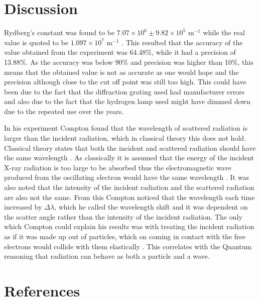 \documentclass[12pt, a4paper]{article}
\begin{document}
\section*{Discussion}
Rydberg's constant was found to be $7.07\times10^6 \pm 9.82\times10^5 \text{ m}^{-1}$ while the real value is quoted to be $1.097\times10^7 \text{ m}^{-1}$ \parencite{muncaster}. This resulted that the accuracy of the value obtained from the experiment was 64.48\%, while it had a precision of 13.88\%. As the accuracy was below 90\% and precision was higher than 10\%, this means that the obtained value is not as accurate as one would hope and the precision although close to the cut off point was still too high. This could have been due to the fact that the diffraction grating used had manufacturer errors and also due to the fact that the hydrogen lamp used might have dimmed down due to the repeated use over the years.

\medskip
\noindent
In his experiment Compton found that the wavelength of scattered radiation is larger than the incident radiation, which in classical theory this does not hold. Classical theory states that both the incident and scattered radiation should have the same wavelength \parencite{muncaster}. As classically it is assumed that the energy of the incident X-ray radiation is too large to be absorbed thus the electromagnetic wave produced from the oscillating electron would have the same wavelength \parencite{Quantum}. It was also noted that the intensity of the incident radiation and the scattered radiation are also not the same. From this Compton noticed that the wavelength each time increased by $\Delta\lambda$, which he called the wavelength shift and it was dependent on the scatter angle rather than the intensity of the incident radiation. The only which Compton could explain his results was with treating the incident radiation as if it was made up out of particles, which on coming in contact with the free electrons would collide with them elastically \parencite{Quantum}. This correlates with the Quantum reasoning that radiation can behave as both a particle and a wave.

\section*{References}
\printbibliography[heading=none]
\end{document}
